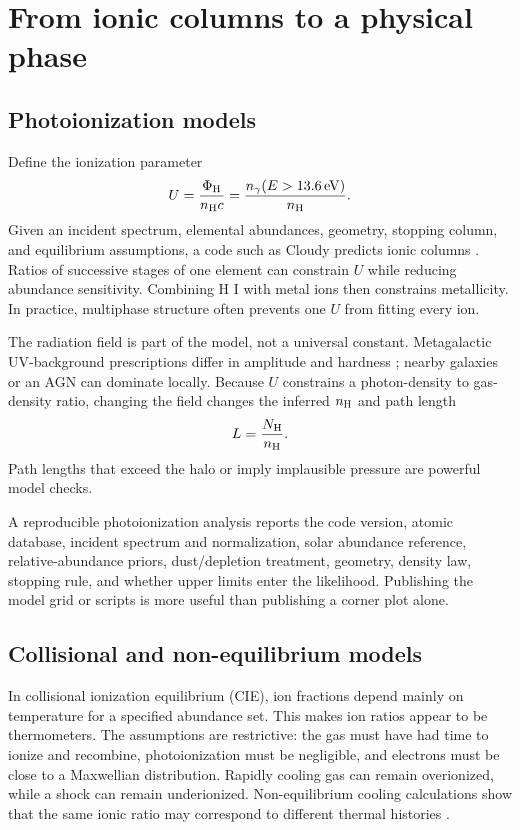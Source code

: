 \section{From ionic columns to a physical phase}

\subsection{Photoionization models}

Define the ionization parameter
\begin{equation}
 U=\frac{\Phi_{\rm H}}{n_{\rm H}c}
  =\frac{n_\gamma(E>13.6\,{\rm eV})}{n_{\rm H}}.
 \label{eq:abs-ionization-parameter}
\end{equation}
Given an incident spectrum, elemental abundances, geometry, stopping column,
and equilibrium assumptions, a code such as Cloudy predicts ionic columns
\citep{Ferland2017}. Ratios of successive stages of one element can constrain
$U$ while reducing abundance sensitivity. Combining H I with metal ions then
constrains metallicity. In practice, multiphase structure often prevents one
$U$ from fitting every ion.

The radiation field is part of the model, not a universal constant.
Metagalactic UV-background prescriptions differ in amplitude and hardness
\citep{HaardtMadau2012}; nearby galaxies or an AGN can dominate locally.
Because $U$ constrains a photon-density to gas-density ratio, changing the
field changes the inferred $n_{\rm H}$ and path length
\begin{equation}
 L=\frac{N_{\rm H}}{n_{\rm H}}.
\end{equation}
Path lengths that exceed the halo or imply implausible pressure are powerful
model checks.

A reproducible photoionization analysis reports the code version, atomic
database, incident spectrum and normalization, solar abundance reference,
relative-abundance priors, dust/depletion treatment, geometry, density law,
stopping rule, and whether upper limits enter the likelihood. Publishing the
model grid or scripts is more useful than publishing a corner plot alone.

\subsection{Collisional and non-equilibrium models}

In collisional ionization equilibrium (CIE), ion fractions depend mainly on
temperature for a specified abundance set. This makes ion ratios appear to be
thermometers. The assumptions are restrictive: the gas must have had time to
ionize and recombine, photoionization must be negligible, and electrons must
be close to a Maxwellian distribution. Rapidly cooling gas can remain
overionized, while a shock can remain underionized. Non-equilibrium cooling
calculations show that the same ionic ratio may correspond to different
thermal histories \citep{GnatSternberg2007}.


